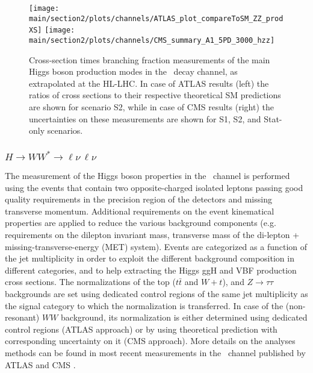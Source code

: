 \begin{figure}
  \centering
  \texttt{[image: \\main/section2/plots/channels/ATLAS\_plot\_compareToSM\_ZZ\_prodXS]}
  \texttt{[image: \\main/section2/plots/channels/CMS\_summary\_A1\_5PD\_3000\_hzz]}
  \caption{Cross-section times branching fraction measurements of the main Higgs boson production modes in the \HZZ\ decay channel, as extrapolated at the HL-LHC. In case of ATLAS results (left) the ratios of cross sections to their respective theoretical SM predictions are shown for scenario S2, while in case of CMS results (right) the uncertainties on these measurements are shown for S1, S2, and Stat-only scenarios.}
  \label{fig:HZZ_ATLAS_HLLHC_S2}
\end{figure}

\subsubsection{$H \to WW^* \to \ell\nu\,\ell\nu$}

The measurement of the Higgs boson properties in the \HWW\ channel is performed using the events that contain two opposite-charged isolated leptons passing good quality requirements in the precision region of the detectors and missing transverse momentum. Additional requirements on the event kinematical properties are applied to reduce the various background components (e.g. requirements on the dilepton invariant mass, transverse mass of the di-lepton + missing-transverse-energy (MET) system). Events are categorized as a function of the jet multiplicity in order to exploit the different background composition in different categories, and to help extracting the Higgs ggH and VBF production cross sections. The normalizations of the top ($t\bar{t}$ and $W+t$), and $Z\rightarrow\tau\tau$ backgrounds are set using dedicated control regions of the same jet multiplicity as the signal category to which the normalization is transferred. In case of the (non-resonant) $WW$ background, its normalization is either determined using dedicated control regions (ATLAS approach) or by using theoretical prediction with corresponding uncertainty on it (CMS approach). More details on the analyses methods can be found in most recent measurements in the \HWW\ channel published by ATLAS \cite{Aaboud:2018jqu} and CMS \cite{Sirunyan:2018egh}.

